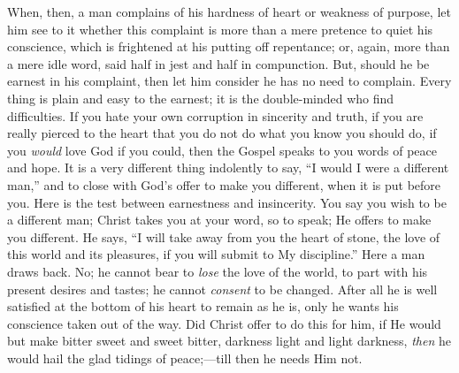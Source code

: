 When, then, a man complains of his hardness of heart
or weakness of purpose, let him see to it whether this
complaint is more than a mere pretence to quiet his
conscience, which is frightened at his putting off
repentance; or, again, more than a mere idle word, said
half in jest and half in compunction. But, should he be
earnest in his complaint, then let him consider he has no
need to complain. Every thing is plain and easy to the
earnest; it is the double-minded who find difficulties.
If you hate your own corruption in sincerity and truth,
if you are really pierced to the heart that you do not do
what you know you should do, if you \emph{would} love
God if you could, then the Gospel speaks to you words of
peace and hope. It is a very different thing indolently
to say, ``I would I were a different man,'' and
to close with God's offer to make you different, when it
is put before you. Here is the test between earnestness
and insincerity. You say you wish to be a different man;
Christ takes you at your word, so to speak; He offers to
make you different. He says, ``I will take away from
you the heart of stone, the love of this world and its
pleasures, if you will submit to My discipline.''
Here a man draws back. No; he cannot bear to \emph{lose}
the love of the world, to part with his present desires
and tastes; he cannot \emph{consent} to be changed.
After all he is well satisfied at the bottom of his heart
to remain as he is, only he wants his conscience taken
out of the way. Did Christ offer to do this for him, if
He would but make bitter sweet and sweet bitter, darkness
light and light darkness, \emph{then} he would hail the
glad tidings of peace;—till then he needs Him not.

